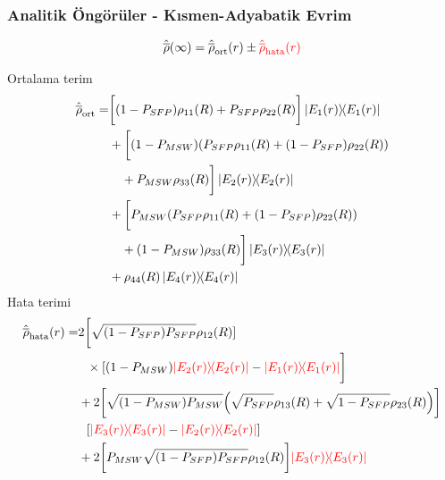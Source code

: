 \documentclass[10pt]{beamer}
\begin{document}
\begin{frame}[noframenumbering]
    \frametitle{Analitik Öngörüler - Kısmen-Adyabatik Evrim}
    \hrulefill
    \tiny

    \begin{equation*}
        \hat{\overline{\rho}}(\infty) = \hat{\overline{\rho}}_{\text{ort}}(r) \pm {\color{red}\hat{\overline{\rho}}_{\text{hata}}(r)}
    \end{equation*}
    \normalsize
    \hrulefill
    
    \color{lightgray}
    Ortalama terim
    \tiny
    \begin{align*}
        \hat{\overline{\rho}}_{\text{ort}}=& \bigg[(1-P_{SFP}) \rho_{11}(R)+ P_{SFP} \rho_{22}(R)\bigg] \dyad{E_{1}(r)}{E_{1}(r)}\\
        &+ \bigg[\qty(1-P_{MSW})\qty(P_{SFP}\rho_{11}(R) +(1-P_{SFP})\rho_{22}(R))\\
        &~~~+ P_{MSW} \rho_{33}(R)\bigg] \dyad{E_{2}(r)}{E_{2}(r)}\\
        &+ \bigg[P_{MSW}\qty(P_{SFP}\rho_{11}(R)+ (1-P_{SFP})\rho_{22}(R))\\
        &~~~+(1-P_{MSW})\rho_{33}(R)\bigg] \dyad{E_{3}(r)}{E_{3}(r)}\\
    &+ \rho_{44}(R) \dyad{E_{4}(r)}{E_{4}(r)}
    \end{align*}
    \normalsize
    \color{black}
    Hata terimi
    \tiny
    \begin{align*}
        \hat{\overline{\rho}}_{\text{hata}}(r)=& 2\bigg[\sqrt{(1-P_{SFP}) P_{SFP}}\rho_{12}(R)]\\
    &~~\times[(1-P_{MSW}){\color{red}\dyad{E_{2}(r)}{E_{2}(r)}} -{\color{red}\dyad{E_{1}(r)}{E_{1}(r)}}\bigg]\\
    &+ 2\bigg[\sqrt{(1-P_{MSW})P_{MSW}}\qty(\sqrt{P_{SFP}}\rho_{13}(R)+\sqrt{1-P_{SFP}}\rho_{23}(R))\bigg]\\ & ~~\qty[{\color{red}\dyad{E_{3}(r)}{E_{3}(r)}} - {\color{red}\dyad{E_{2}(r)}{E_{2}(r)}}]\\
    &+ 2 \bigg[P_{MSW}\sqrt{(1-P_{SFP}) P_{SFP}} \rho_{12}(R)\bigg]{\color{red}\dyad{E_{3}(r)}{E_{3}(r)}}
    \end{align*}
    \normalsize
\end{frame}
\end{document}
